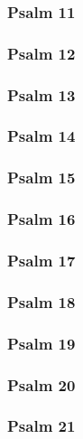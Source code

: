 \documentclass[12pt]{extarticle}
\begin{document}
\begin{multicols}{2}
\subsubsection{Psalm 11}

\newpage

\subsubsection{Psalm 12}

\newpage

\subsubsection{Psalm 13}

\newpage

\subsubsection{Psalm 14}

\newpage

\subsubsection{Psalm 15}

\newpage

\subsubsection{Psalm 16}

\newpage

\subsubsection{Psalm 17}

\newpage

\subsubsection{Psalm 18}

\newpage

\subsubsection{Psalm 19}

\newpage

\subsubsection{Psalm 20}

\newpage

\subsubsection{Psalm 21}

\newpage


\end{multicols}
\end{document}
